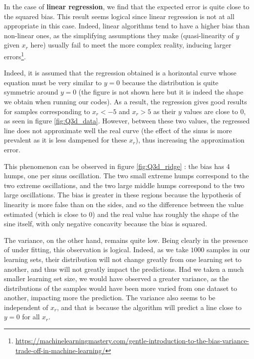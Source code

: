 In the case of {\bf linear regression}, we find that the expected error is quite close to the squared bias. This result seems logical since linear regression is not at all appropriate in this case. Indeed, linear algorithms tend to have a higher bias than non-linear ones, as the simplifying assumptions they make (quasi-linearity of $y$ given $x_r$ here) usually fail to meet the more complex reality, inducing larger errors\footnote{\href{https://machinelearningmastery.com/gentle-introduction-to-the-bias-variance-trade-off-in-machine-learning/}{https://machinelearningmastery.com/gentle-introduction-to-the-bias-variance-trade-off-in-machine-learning/}}.\par
Indeed, it is assumed that the regression obtained is a horizontal curve whose equation must be very similar to $y = 0$ because the distribution is quite \og{}symmetric\fg{} around $y=0$ (the figure is not shown here but it is indeed the shape we obtain when running our codes). As a result, the regression gives good results for samples corresponding to $x_r < -5$ and $x_r > 5$ as their $y$ values are close to $0$, as seen in figure \ref{fig:Q3d_data}. However, between these two values, the regressed line does not approximate well the real curve (the effect of the sinus is more prevalent as it is less dampened for these $x_r$), thus increasing the approximation error.\par
This phenomenon can be observed in figure \ref{fig:Q3d_ridge} : the bias has \num{4} humps, one per sinus oscillation. The two small extreme humps correspond to the two extreme oscillations, and the two large middle humps correspond to the two large oscillations. The bias is greater in these regions because the hypothesis of linearity is more false than on the \og{}sides\fg{}, and so the difference between the value estimated (which is close to $0$) and the real value has roughly the shape of the sine itself, with only negative concavity because the bias is squared.\par
The variance, on the other hand, remains quite low. Being clearly in the presence of under fitting, this observation is logical. Indeed, as we take $1000$ samples in our learning sets, their distribution will not change greatly from one learning set to another, and thus will not greatly impact the predictions. Had we taken a much smaller learning set size, we would have observed a greater variance, as the distributions of the samples would have been more varied from one dataset to another, impacting more the prediction. The variance also seems to be independent of $x_r$, and that is because the algorithm will predict a line close to $y = 0$ for all $x_r$. \par
